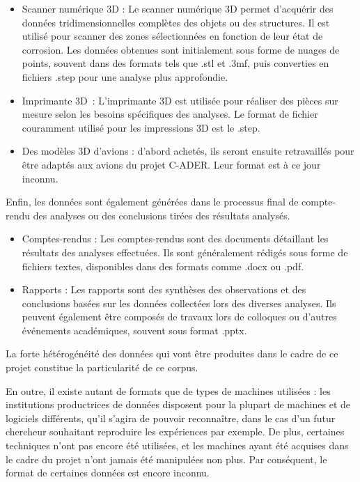 \begin{itemize}
    \item Scanner numérique 3D : Le scanner numérique 3D permet d’acquérir des données tridimensionnelles complètes des objets ou des structures. Il est utilisé pour scanner des zones sélectionnées en fonction de leur état de corrosion. Les données obtenues sont initialement sous forme de nuages de points, souvent dans des formats tels que .stl et .3mf, puis converties en fichiers .step pour une analyse plus approfondie.\\
    \item Imprimante 3D : L'imprimante 3D est utilisée pour réaliser des pièces sur mesure selon les besoins spécifiques des analyses. Le format de fichier couramment utilisé pour les impressions 3D est le .step.\\
    \item Des modèles 3D d'avions : d'abord achetés, ils seront ensuite retravaillés pour être adaptés aux avions du projet C-ADER. Leur format est à ce jour inconnu.\\
\end{itemize}

Enfin, les données sont également générées dans le processus final de compte-rendu des analyses ou des conclusions tirées des résultats analysés.\\

\begin{itemize}
    \item Comptes-rendus : Les comptes-rendus sont des documents détaillant les résultats des analyses effectuées. Ils sont généralement rédigés sous forme de fichiers textes, disponibles dans des formats comme .docx ou .pdf.\\
    \item Rapports : Les rapports sont des synthèses des observations et des conclusions basées sur les données collectées lors des diverses analyses. Ils peuvent également être composés de travaux lors de colloques ou d'autres événements académiques, souvent sous format .pptx.\\
\end{itemize}

La forte hétérogénéité des données qui vont être produites dans le cadre de ce projet constitue la particularité de ce corpus. 

En outre, il existe autant de formats que de types de machines utilisées : les institutions productrices de données disposent pour la plupart de machines et de logiciels différents, qu'il s'agira de pouvoir reconnaître, dans le cas d'un futur chercheur souhaitant reproduire les expériences par exemple. De plus, certaines techniques n’ont pas encore été utilisées, et les machines ayant été acquises dans le cadre du projet n’ont jamais été manipulées non plus. Par conséquent, le format de certaines données est encore inconnu.\\

